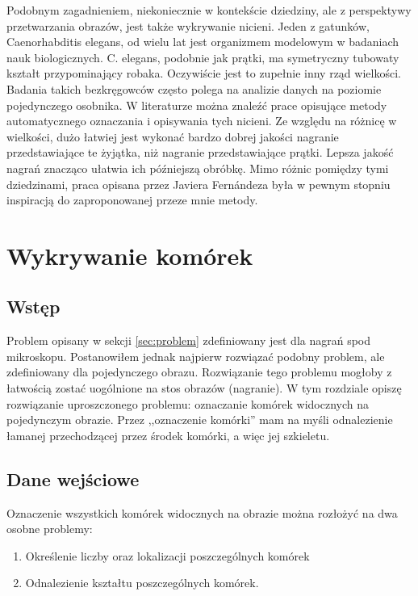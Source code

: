 \documentclass[declaration,shortabstract,mgr]{iithesis}
\begin{document}

Podobnym zagadnieniem, niekoniecznie w kontekście dziedziny, ale z perspektywy przetwarzania obrazów, jest także wykrywanie nicieni.
Jeden z gatunków, Caenorhabditis elegans, od wielu lat jest organizmem modelowym w badaniach nauk biologicznych\cite{wiki:c-elegans}.
C. elegans, podobnie jak prątki, ma symetryczny tubowaty kształt przypominający robaka.
Oczywiście jest to zupełnie inny rząd wielkości.
Badania takich bezkręgowców często polega na analizie danych na poziomie pojedynczego osobnika.
W literaturze można znaleźć prace opisujące metody automatycznego oznaczania i opisywania tych nicieni.
Ze względu na różnicę w wielkości, dużo łatwiej jest wykonać bardzo dobrej jakości nagranie przedstawiające te żyjątka, niż nagranie przedstawiające prątki.
Lepsza jakość nagrań znacząco ułatwia ich późniejszą obróbkę.
Mimo różnic pomiędzy tymi dziedzinami, praca opisana przez Javiera Fernándeza\cite{paper:worm-detection} była w pewnym stopniu inspiracją do zaproponowanej przeze mnie metody.


\section{Wykrywanie komórek}
\label{sec:cell-detection}

\subsection{Wstęp}

Problem opisany w sekcji \ref{sec:problem} zdefiniowany jest dla nagrań spod mikroskopu. Postanowiłem jednak najpierw rozwiązać podobny problem, ale zdefiniowany dla pojedynczego obrazu. Rozwiązanie tego problemu mogłoby z łatwością zostać uogólnione na stos obrazów (nagranie). W tym rozdziale opiszę rozwiązanie uproszczonego problemu: oznaczanie komórek widocznych na pojedynczym obrazie. Przez ,,oznaczenie komórki'' mam na myśli odnalezienie łamanej przechodzącej przez środek komórki, a więc jej szkieletu.

\subsection{Dane wejściowe}
\label{sec:detection-input}

Oznaczenie wszystkich komórek widocznych na obrazie można rozłożyć na dwa osobne problemy:
\begin{enumerate}
  \item Określenie liczby oraz lokalizacji poszczególnych komórek
  \item Odnalezienie kształtu poszczególnych komórek.
\end{enumerate}
\end{document}
